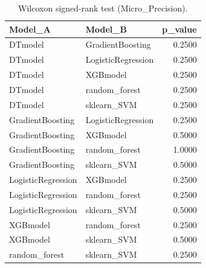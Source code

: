 \begin{table}[t]
\centering
\begin{tabular}{llr}
\toprule
Model_A & Model_B & p_value \\
\midrule
DTmodel & GradientBoosting & 0.2500 \\
DTmodel & LogisticRegression & 0.2500 \\
DTmodel & XGBmodel & 0.2500 \\
DTmodel & random_forest & 0.2500 \\
DTmodel & sklearn_SVM & 0.2500 \\
GradientBoosting & LogisticRegression & 0.2500 \\
GradientBoosting & XGBmodel & 0.5000 \\
GradientBoosting & random_forest & 1.0000 \\
GradientBoosting & sklearn_SVM & 0.5000 \\
LogisticRegression & XGBmodel & 0.2500 \\
LogisticRegression & random_forest & 0.2500 \\
LogisticRegression & sklearn_SVM & 0.5000 \\
XGBmodel & random_forest & 0.2500 \\
XGBmodel & sklearn_SVM & 0.5000 \\
random_forest & sklearn_SVM & 0.2500 \\
\bottomrule
\end{tabular}
\caption{Wilcoxon signed-rank test (Micro_Precision).}
\label{tab:wilcoxon_Micro_Precision}
\end{table}